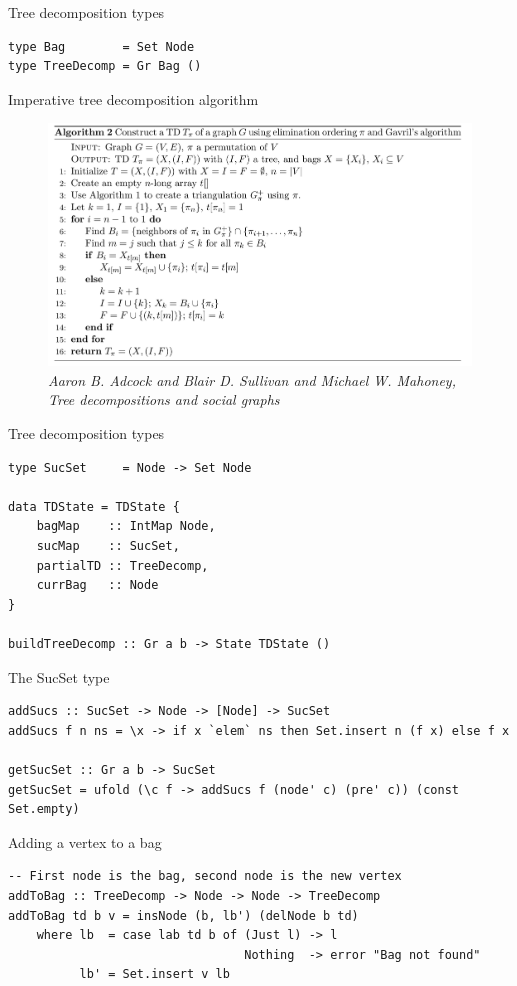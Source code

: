 \documentclass{beamer}
\begin{document}
\begin{frame}[fragile]{Tree decomposition types}
\begin{verbatim}
type Bag        = Set Node
type TreeDecomp = Gr Bag ()

\end{verbatim}
\end{frame}

\begin{frame}{Imperative tree decomposition algorithm}
\begin{figure}
    \includegraphics[scale=0.5]{algo.png}
    \caption*{\textit{Aaron B. Adcock and Blair D. Sullivan and Michael W. Mahoney, Tree decompositions and social graphs}}
\end{figure}
\end{frame}

\begin{frame}[fragile]{Tree decomposition types}
\begin{verbatim}
type SucSet     = Node -> Set Node

data TDState = TDState {
    bagMap    :: IntMap Node,
    sucMap    :: SucSet,
    partialTD :: TreeDecomp,
    currBag   :: Node
}

buildTreeDecomp :: Gr a b -> State TDState ()
\end{verbatim}
\end{frame}

\begin{frame}[fragile]{The SucSet type}
\begin{verbatim}
addSucs :: SucSet -> Node -> [Node] -> SucSet
addSucs f n ns = \x -> if x `elem` ns then Set.insert n (f x) else f x
        
getSucSet :: Gr a b -> SucSet
getSucSet = ufold (\c f -> addSucs f (node' c) (pre' c)) (const Set.empty)  
\end{verbatim}
\end{frame}

\begin{frame}[fragile]{Adding a vertex to a bag}
\begin{verbatim}
-- First node is the bag, second node is the new vertex
addToBag :: TreeDecomp -> Node -> Node -> TreeDecomp
addToBag td b v = insNode (b, lb') (delNode b td)
    where lb  = case lab td b of (Just l) -> l
                                 Nothing  -> error "Bag not found"                           
          lb' = Set.insert v lb
\end{verbatim}
\end{frame}
\end{document}
